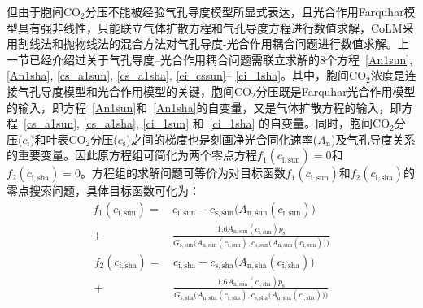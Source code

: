但由于胞间$\mathrm {CO_2}$分压不能被经验气孔导度模型所显式表达，且光合作用Farquhar模型具有强非线性，只能联立气体扩散方程和气孔导度方程进行数值求解，CoLM采用割线法和抛物线法的混合方法对气孔导度-光合作用耦合问题进行数值求解。上一节已经介绍过关于气孔导度--光合作用耦合问题需联立求解的8个方程~\eqref{An1sun}, \eqref{An1sha}, \eqref{cs_a1sun}, \eqref{cs_a1sha}, \eqref{ei_cssun}--%
\eqref{ci_1sha}。其中，胞间$\mathrm{CO_2}$浓度是连接气孔导度模型和光合作用模型的关键，胞间$\mathrm{CO_2}$分压既是Farquhar光合作用模型的输入，即方程~\eqref{An1sun}和~\eqref{An1sha}的自变量，又是气体扩散方程的输入，即方程~\eqref{cs_a1sun}, \eqref{cs_a1sha}, \eqref{ci_1sun} 和~\eqref{ci_1sha} 的自变量。同时，胞间$\mathrm{CO_2}$分压($c_{\mathrm{i}}$)和叶表$\mathrm{CO_2}$分压($c_{\mathrm{s}}$)之间的梯度也是刻画净光合同化速率($A_{\mathrm{n}}$)及气孔导度关系的重要变量。因此原方程组可简化为两个零点方程$f_1(c_{\mathrm{i,sun}})=0$和$f_2(c_{\mathrm{i,sha}})=0$。方程组的求解问题可等价为对目标函数$f_1(c_{\mathrm{i,sun}})$和$f_2(c_{\mathrm{i,sha}})$的零点搜索问题，具体目标函数可化为：
\begin{align}\label{f1_cisun}
f_{\mathrm{1}}\left(c_{\mathrm{i,sun}}\right)=&\,c_{\mathrm{i,sun}}-c_{\mathrm{s,sun}}\big(A_{\mathrm{n,sun}}\left(c_{\mathrm{i,sun}}\right)\big) \nonumber \\[1ex]
+& \, \frac{1.6A_{\mathrm{n,sun}}\left(c_{\mathrm{i,sun}}\right)p_{\mathrm {s}} }{G_{\mathrm{s,sun}}\Big(A_{\mathrm{n,sun}}\left(c_{\mathrm{i,sun}}\right),c_{\mathrm{s,sun}}\big(A_{\mathrm{n,sun}}\left(c_{\mathrm{i,sun}}\right)\big)\Big)}
\end{align}
\begin{align}\label{f1_cisha}
f_{\mathrm{2}}\left(c_{\mathrm{i,sha}}\right)=&\,c_{\mathrm{i,sha}}-c_{\mathrm{s,sha}}\big(A_{\mathrm{n,sha}}\left(c_{\mathrm{i,sha}}\right)\big) \nonumber \\[1ex]
+& \, \frac{1.6A_{\mathrm{n,sha}}\left(c_{\mathrm{i,sha}}\right)p_{\mathrm {s}} }{G_{\mathrm{s,sha}}\Big(A_{\mathrm{n,sha}}\left(c_{\mathrm{i,sha}}\right),c_{\mathrm{s,sha}}\big(A_{\mathrm{n,sha}}\left(c_{\mathrm{i,sha}}\right)\big)\Big)}
\end{align}

